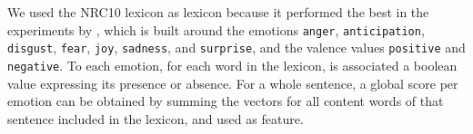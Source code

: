 \documentclass[11pt]{article}
\newcommand{\note}[1]{\textbf{*** #1 ***}}
\begin{document}
We used the NRC10 lexicon as lexicon because it performed the best in the experiments by \cite{mohammad:2012:NAACL-HLT}, which is built around the emotions \texttt{anger}, \texttt{anticipation}, \texttt{disgust}, \texttt{fear}, \texttt{joy}, \texttt{sadness}, and \texttt{surprise}, and the valence values \texttt{positive} and \texttt{negative}. To each emotion, for each word in the lexicon, is associated a boolean value expressing its presence or absence. For a whole sentence, a global score per emotion can be obtained by summing the vectors for all content words of that sentence included in the lexicon, and used as feature.
%


%
%
%
%
%
\end{document}
